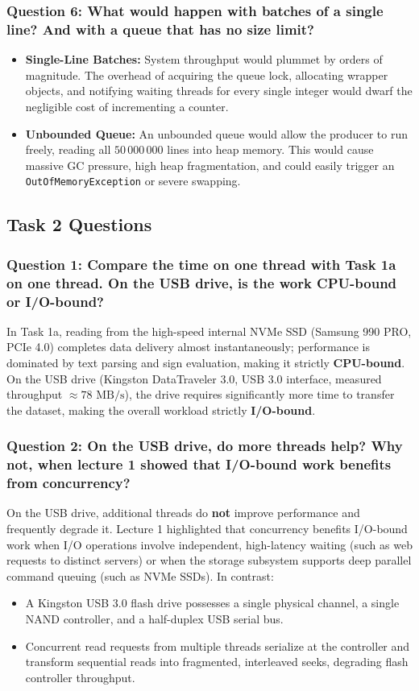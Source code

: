 \documentclass[12pt,a4paper]{article}
\begin{document}
\subsubsection{Question 6: What would happen with batches of a single line? And with a queue that has no size limit?}
\begin{itemize}
    \item \textbf{Single-Line Batches:} System throughput would plummet by orders of magnitude. The overhead of acquiring the queue lock, allocating wrapper objects, and notifying waiting threads for every single integer would dwarf the negligible cost of incrementing a counter.
    \item \textbf{Unbounded Queue:} An unbounded queue would allow the producer to run freely, reading all $50\,000\,000$ lines into heap memory. This would cause massive GC pressure, high heap fragmentation, and could easily trigger an \texttt{OutOfMemoryException} or severe swapping.
\end{itemize}

\subsection{Task 2 Questions}

\subsubsection{Question 1: Compare the time on one thread with Task 1a on one thread. On the USB drive, is the work CPU-bound or I/O-bound?}
In Task 1a, reading from the high-speed internal NVMe SSD (Samsung 990 PRO, PCIe 4.0) completes data delivery almost instantaneously; performance is dominated by text parsing and sign evaluation, making it strictly \textbf{CPU-bound}. On the USB drive (Kingston DataTraveler 3.0, USB 3.0 interface, measured throughput $\approx 78\text{ MB/s}$), the drive requires significantly more time to transfer the dataset, making the overall workload strictly \textbf{I/O-bound}.

\subsubsection{Question 2: On the USB drive, do more threads help? Why not, when lecture 1 showed that I/O-bound work benefits from concurrency?}
On the USB drive, additional threads do \textbf{not} improve performance and frequently degrade it. Lecture 1 highlighted that concurrency benefits I/O-bound work when I/O operations involve independent, high-latency waiting (such as web requests to distinct servers) or when the storage subsystem supports deep parallel command queuing (such as NVMe SSDs). In contrast:
\begin{itemize}
    \item A Kingston USB 3.0 flash drive possesses a single physical channel, a single NAND controller, and a half-duplex USB serial bus.
    \item Concurrent read requests from multiple threads serialize at the controller and transform sequential reads into fragmented, interleaved seeks, degrading flash controller throughput.
\end{itemize}
\end{document}
